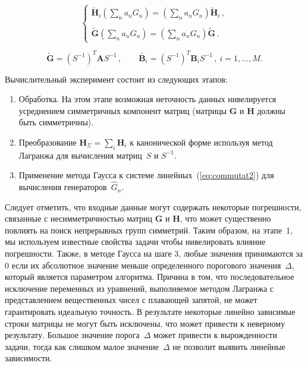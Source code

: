 \begin{equation}
\label{eq:commutat2}
\left\{
\begin{array}{l}
\displaystyle
\tilde{\textbf{H}}_i \left(\sum\limits_na_nG_n\right) =
\left(\sum\limits_na_nG_n\right)\tilde{\textbf{H}}_i \, , \\ \\
\displaystyle
\tilde{\textbf{G}} \left(\sum\limits_na_nG_n\right) = \left(\sum\limits_na_nG_n\right)\tilde{\textbf{G}} \, .
\end{array}
\right.
\end{equation}

\begin{equation}
\tilde{\textbf{G}}=\left(S^{-1}\right)^T \textbf{A} S^{-1} \, , \qquad
\tilde{\textbf{B}_i}=\left(S^{-1}\right)^T \textbf{B}_i S^{-1} \, , \ i=1,\dots,M.
\end{equation}

Вычислительный эксперимент состоит из следующих этапов:
\begin{enumerate}
  \item Обработка. На этом этапе возможная неточность данных нивелируется усреднением симметричных компонент матриц (матрицы $\textbf{G}$ и $\textbf{H}$ должны быть симметричны).
  \item %
  Преобразование $ {\textbf{H}}_{\Sigma} = \sum_{i} \textbf{H}_i$ к канонической форме используя метод Лагранжа для вычисления матриц~$S$ и $S^{-1} $.
  \item Применение метода Гаусса к системе линейных~(\ref{eq:commutat2}) для вычисления генераторов~$\hat{G}_n$.
\end{enumerate}

Следует отметить, что входные данные могут содержать некоторые погрешности, связанные с несимметричностью матриц $\textbf{G}$ и $\textbf{H}$, что может существенно повлиять на поиск непрерывных групп симметрий. Таким образом, на этапе~1, мы используем известные свойства задачи чтобы нивелировать влияние погрешности.
Также, в методе Гаусса на шаге 3, любые значения принимаются за 0 если их абсолютное значение меньше определенного порогового значения~$\Delta$, который является параметром алгоритма. Причина в том, что последовательное исключение переменных из уравнений, выполняемое методом Лагранжа с представлением вещественных чисел с плавающей запятой, не может гарантировать идеальную точность.
В результате некоторые линейно зависимые строки матрицы не могут быть исключены, что может привести к неверному результату.
Большое значение порога~$\Delta$ может привести к вырожденности задачи, тогда как слишком малое значение~$\Delta$ не позволит выявить линейные зависимости.

